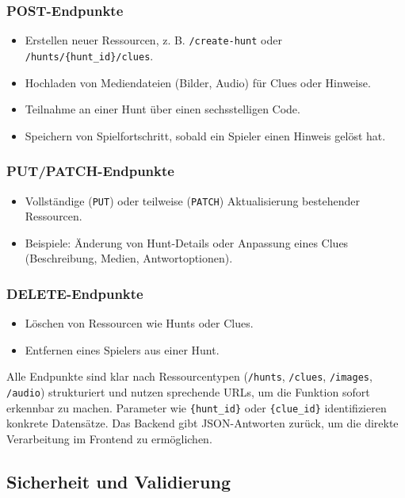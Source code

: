 \documentclass[oneside]{ausarbeitung}
\begin{document}
\subsubsection{POST-Endpunkte}
\begin{itemize}
    \item Erstellen neuer Ressourcen, z. B. \texttt{/create-hunt} oder \texttt{/hunts/\{hunt\_id\}/clues}.
    \item Hochladen von Mediendateien (Bilder, Audio) für Clues oder Hinweise.
    \item Teilnahme an einer Hunt über einen sechsstelligen Code.
    \item Speichern von Spielfortschritt, sobald ein Spieler einen Hinweis gelöst hat.
\end{itemize}

\subsubsection{PUT/PATCH-Endpunkte}
\begin{itemize}
    \item Vollständige (\texttt{PUT}) oder teilweise (\texttt{PATCH}) Aktualisierung bestehender Ressourcen.
    \item Beispiele: Änderung von Hunt-Details oder Anpassung eines Clues (Beschreibung, Medien, Antwortoptionen).
\end{itemize}

\subsubsection{DELETE-Endpunkte}
\begin{itemize}
    \item Löschen von Ressourcen wie Hunts oder Clues.
    \item Entfernen eines Spielers aus einer Hunt.
\end{itemize}

Alle Endpunkte sind klar nach Ressourcentypen (\texttt{/hunts}, \texttt{/clues}, \texttt{/images}, \texttt{/audio}) 
strukturiert und nutzen sprechende URLs, um die Funktion sofort erkennbar zu machen. 
Parameter wie \texttt{\{hunt\_id\}} oder \texttt{\{clue\_id\}} identifizieren konkrete Datensätze. 
Das Backend gibt JSON-Antworten zurück, um die direkte Verarbeitung im Frontend zu ermöglichen.

\subsection{Sicherheit und Validierung}
\end{document}
